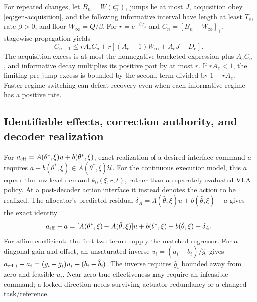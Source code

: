 For repeated changes, let $B_n=W(t_n^-)$, jumps be at most $J$,
acquisition obey \eqref{eq:gen-acquisition}, and the following informative
interval have length at least $T_s$, rate $\beta>0$, and floor
$W_\infty=Q/\beta$. For $r=e^{-\beta T_s}$ and
$C_n=[B_n-W_\infty]_+$, stagewise propagation yields
\begin{equation}
 C_{n+1}\le rA_eC_n+
 r[(A_e-1)W_\infty+A_eJ+D_e].
 \label{eq:gen-repeat}
\end{equation}
The acquisition excess is at most the nonnegative bracketed expression
plus $A_eC_n$, and informative decay multiplies its positive part by at
most $r$. If $rA_e<1$, the limiting pre-jump excess is bounded by the
second term divided by $1-rA_e$. Faster regime switching can defeat
recovery even when each informative regime has a positive rate.

\subsection{Identifiable effects, correction authority, and decoder realization}
\label{app:gen-authority}
For $a_{\rm eff}=A(\theta^*,\xi)u+b(\theta^*,\xi)$, exact realization of a
desired interface command $a$ requires
$a-b(\theta^*,\xi)\in A(\theta^*,\xi)\mathcal U$.
For the continuous execution model, this $a$ equals the low-level demand
$k_0(\xi,r,t)$, rather than a separately evaluated VLA policy. At a
post-decoder action interface it instead denotes the action to be realized.
The allocator's predicted residual
$\delta_A=A(\hat\theta,\xi)u+b(\hat\theta,\xi)-a$ gives the exact identity
\begin{equation}
 a_{\rm eff}-a=[A(\theta^*,\xi)-A(\hat\theta,\xi)]u
 +b(\theta^*,\xi)-b(\hat\theta,\xi)+\delta_A.
 \label{eq:gen-alloc-exact}
\end{equation}
For affine coefficients the first two terms supply the matched regressor.
For a diagonal gain and offset, an unsaturated inverse
$u_i=(a_i-\hat b_i)/\hat g_i$ gives
$a_{{\rm eff},i}-a_i=(g_i-\hat g_i)u_i+(b_i-\hat b_i)$.
The inverse requires $\hat g_i$ bounded away from zero and feasible $u_i$.
Near-zero true effectiveness may require an infeasible command; a locked
direction needs surviving actuator redundancy or a changed task/reference.

